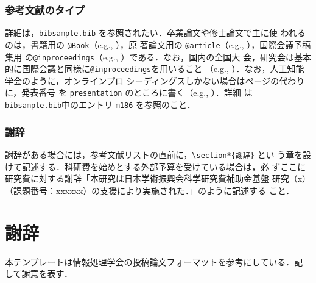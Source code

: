 \documentclass[a4j]{matsushita-zemi}
\begin{document}
\subsubsection{参考文献のタイプ}

詳細は，\verb|bibsample.bib| を参照されたい．卒業論文や修士論文で主に使
われるのは，書籍用の \verb|@Book|（e.g., \cite{okumura,companion}），原
著論文用の \verb|@article|（e.g., \cite{j024, j027}），国際会議予稿集用
の\verb|@inproceedings|（e.g., \cite{c028}）である．なお，国内の全国大
会，研究会は基本的に国際会議と同様に\verb|@inproceedings|を用いること
（e.g., \cite{m139, m174}）．なお，人工知能学会のように，オンラインプロ
シーディングスしかない場合はページの代わりに，発表番号
を \verb|presentation| のところに書く（e.g., \cite{m186}）．詳細
は \verb|bibsample.bib|中のエントリ \verb|m186| を参照のこと．


\subsubsection{謝辞}

謝辞がある場合には，参考文献リストの直前に，\verb|\section*{謝辞}| とい
う章を設けて記述する．科研費を始めとする外部予算を受けている場合は，必
ずここに研究費に対する謝辞「本研究は日本学術振興会科学研究費補助金基盤
研究（x）（課題番号：xxxxxx）の支援により実施された．」のように記述する
こと．


\section*{謝辞}
本テンプレートは情報処理学会の投稿論文フォーマットを参考にしている．記
して謝意を表す．




\end{document}

